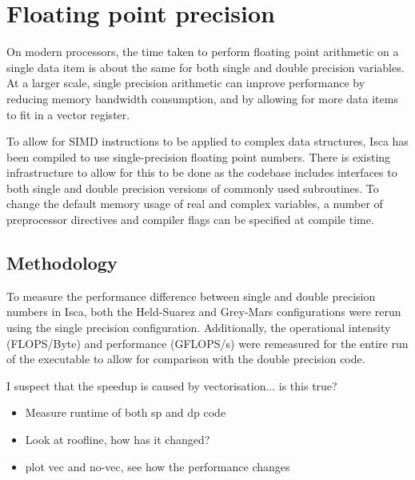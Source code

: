 \documentclass[a4paper,11pt]{report}
\begin{document}
\newpage
\section{Floating point precision}
\label{sec:floating-pont}
On modern processors, the time taken to perform floating point arithmetic on a single data item is about the same for both single and double precision variables. At a larger scale, single precision arithmetic can improve performance by reducing memory bandwidth consumption, and by allowing for more data items to fit in a vector register. 
\par
To allow for SIMD instructions to be applied to complex data structures, Isca has been compiled to use single-precision floating point numbers. There is existing infrastructure to allow for this to be done as the codebase includes interfaces to both single and double precision versions of commonly used subroutines. To change the default memory usage of real and complex variables, a number of preprocessor directives and compiler flags can be specified at compile time. 

\subsection{Methodology}
To measure the performance difference between single and double precision numbers in Isca, both the Held-Suarez and Grey-Mars configurations were rerun using the single precision configuration. Additionally, the operational intensity (FLOPS/Byte) and performance (GFLOPS/s) were remeasured for the entire run of the executable to allow for comparison with the double precision code. 
\par
I suspect that the speedup is caused by vectorisation... is this true?
\begin{itemize}
	\item Measure runtime of both sp and dp code
	\item Look at roofline, how has it changed? 
	\item plot vec and no-vec, see how the performance changes
\end{itemize}
\end{document}
